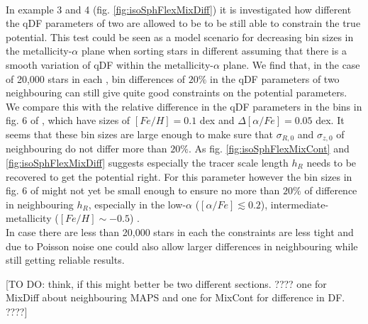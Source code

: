 \\In example 3 and 4 (fig. \ref{fig:isoSphFlexMixDiff}) it is investigated how different the qDF parameters of two \MAPs are allowed to be to be still able to constrain the true potential. This test could be seen as a model scenario for decreasing bin sizes in the metallicity-$\alpha$ plane when sorting stars in different \MAPs assuming that there is a smooth variation of qDF within the metallicity-$\alpha$ plane. We find that, in the case of 20,000 stars in each \MAP, bin differences of $20\%$ in the qDF parameters of two neighbouring \MAPs can still give quite good constraints on the potential parameters. We compare this with the relative difference in the qDF parameters in the bins in fig. 6 of \cite{bov13}, which have sizes of $[Fe/H] = 0.1$ dex and $\Delta [\alpha/Fe] = 0.05$ dex. It seems that these bin sizes are large enough to make sure that $\sigma_{R,0}$ and $\sigma_{z,0}$ of neighbouring \MAPs do not differ more than $20\%$. As fig. \ref{fig:isoSphFlexMixCont} and \ref{fig:isoSphFlexMixDiff} suggests especially the tracer scale length $h_R$ needs to be recovered to get the potential right. For this parameter however the bin sizes in fig. 6 of \cite{bov13} might not yet be small enough to ensure no more than $20\%$ of difference in neighbouring $h_R$, especially in the low-$\alpha$ ($[\alpha/Fe] \lesssim 0.2$), intermediate-metallicity ($[Fe/H] \sim -0.5$) \MAPs.
\\In case there are less than 20,000 stars in each \MAP the constraints are less tight and due to Poisson noise one could also allow larger differences in neighbouring \MAPs while still getting reliable results.

[TO DO: think, if this might better be two different sections. ???? one for MixDiff about neighbouring MAPS and one for MixCont for difference in DF. ????]



